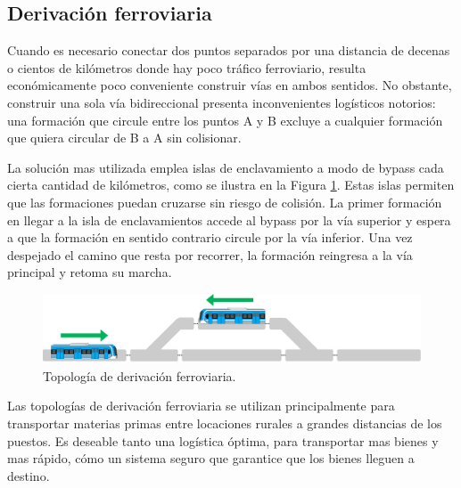 \subsection{Derivación ferroviaria}

Cuando es necesario conectar dos puntos separados por una distancia de decenas o cientos de kilómetros donde hay poco tráfico ferroviario, resulta económicamente poco conveniente construir vías en ambos sentidos. No obstante, construir una sola vía bidireccional presenta inconvenientes logísticos notorios: una formación que circule entre los puntos A y B excluye a cualquier formación que quiera circular de B a A sin colisionar. %

La solución mas utilizada emplea islas de enclavamiento a modo de bypass cada cierta cantidad de kilómetros, como se ilustra en la Figura \ref{fig:bypass_1}. Estas islas permiten que las formaciones puedan cruzarse sin riesgo de colisión. La primer formación en llegar a la isla de enclavamientos accede al bypass por la vía superior y espera a que la formación en sentido contrario circule por la vía inferior. Una vez despejado el camino que resta por recorrer, la formación reingresa a la vía principal y retoma su marcha.

    \begin{figure}[H]
        \centering
        \includegraphics[width=1\textwidth]{Figuras/bypass}
        \centering\caption{Topología de derivación ferroviaria.}
        \label{fig:bypass_1}
    \end{figure}
    
Las topologías de derivación ferroviaria se utilizan principalmente para transportar materias primas entre locaciones rurales a grandes distancias de los puestos. Es deseable tanto una logística óptima, para transportar mas bienes y mas rápido, cómo un sistema seguro que garantice que los bienes lleguen a destino.